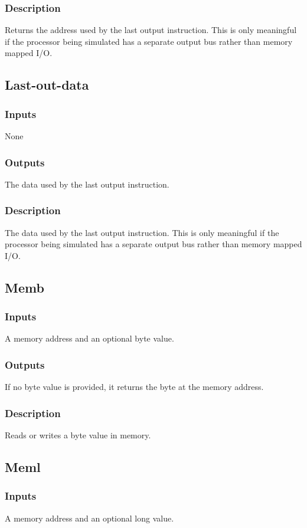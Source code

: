 \documentclass[10pt, openany]{book}
\begin{document}
\subsubsection{Description}
Returns the address used by the last output instruction.  This is only meaningful if the processor being simulated has a separate output bus rather than memory mapped I/O.

\subsection{Last-out-data}
\subsubsection{Inputs}
None
\subsubsection{Outputs}
The data used by the last output instruction.
\subsubsection{Description}
The data used by the last output instruction.  This is only meaningful if the processor being simulated has a separate output bus rather than memory mapped I/O.

\subsection{Memb}
\subsubsection{Inputs}
A memory address and an optional byte value.
\subsubsection{Outputs}
If no byte value is provided, it returns the byte at the memory address.
\subsubsection{Description}
Reads or writes a byte value in memory.

\subsection{Meml}
\subsubsection{Inputs}
A memory address and an optional long value.
\end{document}
